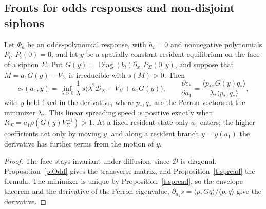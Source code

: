 \subsection{Fronts for odds responses and non-disjoint siphons}\label{s:spaOv}
Let $\Phi_a$ be an odds-polynomial response, with $h_i=0$ and nonnegative polynomials $P_i$, $P_i(0)=0$, and let $y$ be a spatially constant resident equilibrium on the face of a siphon $\Sigma$.
Put $G(y)=\operatorname{Diag}(b_i)\partial_{x_\Sigma}P_\Sigma(0,y)$, and suppose that $M=a_1G(y)-V_\Sigma$ is irreducible with $s(M)>0$. Then
\[
 c_*(a_1,y)=\inf_{\lambda>0}\frac1\lambda\,s\bigl(\lambda^2\mathcal D_\Sigma-V_\Sigma+a_1G(y)\bigr),\qquad
 \frac{\partial c_*}{\partial a_1}=\frac{\langle p_*,G(y)q_*\rangle}{\lambda_*\langle p_*,q_*\rangle},
\]
with $y$ held fixed in the derivative, where $p_*,q_*$ are the Perron vectors at the minimizer $\lambda_*$. This linear spreading speed is positive exactly when $R_\Sigma=a_1\rho(G(y)V_\Sigma^{-1})>1$. At a fixed resident
state only $a_1$ enters; the higher coefficients act only by moving $y$, and along a resident branch $y=y(a_1)$ the derivative has further terms from the motion of $y$.
\eeC
\begin{proof}
The face stays invariant under diffusion, since $\mathcal D$ is diagonal. Proposition~\ref{p:Odd} gives the transverse matrix, and Proposition~\ref{t:spread} the formula. The minimizer is
unique by Proposition~\ref{t:spread}, so the envelope theorem and the derivative of the Perron eigenvalue, $\partial_{a_1}s=\langle p,Gq\rangle/\langle p,q\rangle$ give the derivative.
\end{proof}

